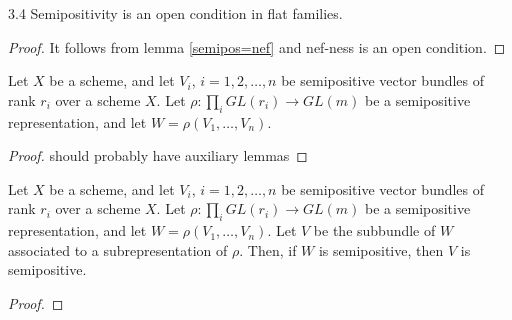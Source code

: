 \begin{lemma}
3.4 Semipositivity is an open condition in flat families.
\end{lemma}
\begin{proof}
It follows from lemma \ref{semipos=nef} and nef-ness is an open condition.
\end{proof}

\begin{lemma}
Let $X$ be a scheme, and let $V_i$, $i=1,2,\ldots,n$ be semipositive vector bundles of rank $r_i$ over a scheme $X$. Let $\rho:\prod_i GL(r_i)\to GL(m)$ be a semipositive representation, and let $W=\rho(V_1,\ldots,V_n)$. 
\end{lemma}

\begin{proof}
should probably have auxiliary lemmas
\end{proof}

\begin{lemma}
Let $X$ be a scheme, and let $V_i$, $i=1,2,\ldots,n$ be semipositive vector bundles of rank $r_i$ over a scheme $X$. Let $\rho:\prod_i GL(r_i)\to GL(m)$ be a semipositive representation, and let $W=\rho(V_1,\ldots,V_n)$. Let $V$ be the subbundle of $W$ associated to a subrepresentation of $\rho$. Then, if $W$ is semipositive, then $V$ is semipositive.
\end{lemma}

\begin{proof}

\end{proof}







